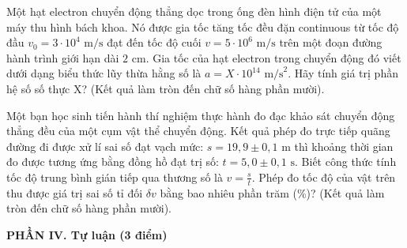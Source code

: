 \begin{ex}%
	Một hạt electron chuyển động thẳng dọc trong ống đèn hình điện tử của một máy thu hình bách khoa. Nó được gia tốc tăng tốc đều đặn continuous từ tốc độ đầu $v_0 = 3 \cdot 10^{4}\text{ m/s}$ đạt đến tốc độ cuối $v = 5 \cdot 10^{6}\text{ m/s}$ trên một đoạn đường hành trình giới hạn dài $2\text{ cm}$. Gia tốc của hạt electron trong chuyển động đó viết dưới dạng biểu thức lũy thừa hằng số là $a = X \cdot 10^{14}\text{ m/s}^2$. Hãy tính giá trị phần hệ số số thực X? (Kết quả làm tròn đến chữ số hàng phần mười).
\end{ex}

\begin{ex}%
	Một bạn học sinh tiến hành thí nghiệm thực hành đo đạc khảo sát chuyển động thẳng đều của một cụm vật thể chuyển động. Kết quả phép đo trực tiếp quãng đường đi được xử lí sai số đạt vạch mức: $s = 19,9 \pm 0,1\text{ m}$ thì khoảng thời gian đo được tương ứng bằng đồng hồ đạt trị số: $t = 5,0 \pm 0,1\text{ s}$. Biết công thức tính tốc độ trung bình gián tiếp qua thương số là $v=\frac{s}{t}$. Phép đo tốc độ của vật trên thu được giá trị sai số tỉ đối $\delta v$ bằng bao nhiêu phần trăm (\%)? (Kết quả làm tròn đến chữ số hàng phần mười).
\end{ex}


\noindent \textbf{PHẦN IV. Tự luận (3 điểm)}
\vspace{0.2cm}

